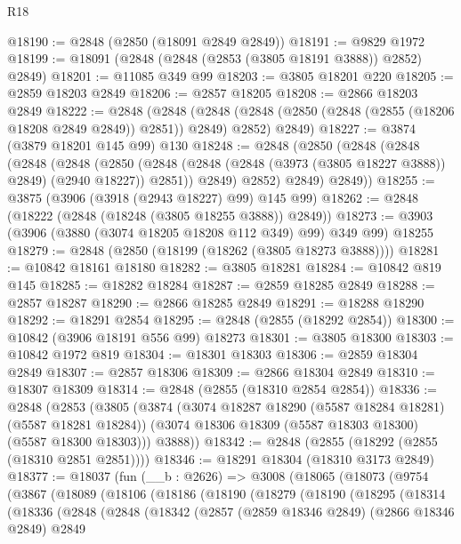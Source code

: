 \begin{lexlean}{R18}
\begin{coremodule}
@18190 := @2848 (@2850 (@18091 @2849 @2849))
@18191 := @9829 @1972
@18199 := @18091 (@2848 (@2848 (@2853 (@3805 @18191 @3888)) @2852) @2849)
@18201 := @11085 @349 @99
@18203 := @3805 @18201 @220
@18205 := @2859 @18203 @2849
@18206 := @2857 @18205
@18208 := @2866 @18203 @2849
@18222 := @2848
    (@2848
      (@2848 (@2848 (@2850 (@2848 (@2855 (@18206 @18208 @2849 @2849)) @2851)) @2849) @2852)
      @2849)
@18227 := @3874 (@3879 @18201 @145 @99) @130
@18248 := @2848
    (@2850
      (@2848
        (@2848
          (@2848
            (@2848
              (@2850
                (@2848 (@2848 (@2848 (@3973 (@3805 @18227 @3888)) @2849) (@2940 @18227)) @2851))
              @2849)
            @2852)
          @2849)
        @2849))
@18255 := @3875 (@3906 (@3918 (@2943 @18227) @99) @145 @99)
@18262 := @2848 (@18222 (@2848 (@18248 (@3805 @18255 @3888)) @2849))
@18273 := @3903 (@3906 (@3880 (@3074 @18205 @18208 @112 @349) @99) @349 @99) @18255
@18279 := @2848 (@2850 (@18199 (@18262 (@3805 @18273 @3888))))
@18281 := @10842 @18161 @18180
@18282 := @3805 @18281
@18284 := @10842 @819 @145
@18285 := @18282 @18284
@18287 := @2859 @18285 @2849
@18288 := @2857 @18287
@18290 := @2866 @18285 @2849
@18291 := @18288 @18290
@18292 := @18291 @2854
@18295 := @2848 (@2855 (@18292 @2854))
@18300 := @10842 (@3906 @18191 @556 @99) @18273
@18301 := @3805 @18300
@18303 := @10842 @1972 @819
@18304 := @18301 @18303
@18306 := @2859 @18304 @2849
@18307 := @2857 @18306
@18309 := @2866 @18304 @2849
@18310 := @18307 @18309
@18314 := @2848 (@2855 (@18310 @2854 @2854))
@18336 := @2848
    (@2853
      (@3805
        (@3874
          (@3074 @18287 @18290 (@5587 @18284 @18281) (@5587 @18281 @18284))
          (@3074 @18306 @18309 (@5587 @18303 @18300) (@5587 @18300 @18303)))
        @3888))
@18342 := @2848 (@2855 (@18292 (@2855 (@18310 @2851 @2851))))
@18346 := @18291 @18304 (@18310 @3173 @2849)
@18377 := @18037
    (fun (__b : @2626) =>
    @3008
      (@18065
        (@18073
          (@9754
            (@3867
              (@18089
                (@18106
                  (@18186
                    (@18190
                      (@18279
                        (@18190
                          (@18295
                            (@18314
                              (@18336
                                (@2848
                                  (@2848
                                    (@18342
                                      (@2857
                                        (@2859 @18346 @2849)
                                        (@2866 @18346 @2849)
                                        @2849

\end{coremodule}
\end{lexlean}
